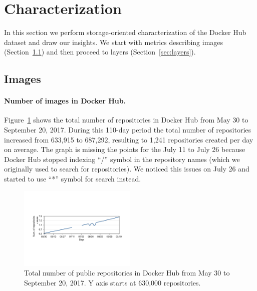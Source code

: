 \section{Characterization}
\label{sec:char}

In this section we perform storage-oriented characterization of the Docker Hub
dataset and draw our insights.
%
We start with metrics describing images (Section~\ref{sec:images}) and then
proceed to layers (Section~\ref{sec:layers}).

\subsection{Images}
\label{sec:images}

\paragraph{Number of images in Docker Hub.}

Figure~\ref{fig_image_growth} shows the total number of repositories in Docker
Hub from May 30 to September 20, 2017.
During this 110-day period the total number of repositories increased from
633,915 to 687,292, resulting to 1,241 repositories created per day on average.
%
The graph is missing the points for the July 11 to July 26 because Docker Hub
stopped indexing ``/'' symbol in the repository names (which we originally used to
search for repositories).
%
We noticed this issues on July 26 and started to use ``*'' symbol for search
instead.



\begin{figure}
  \centering
  \includegraphics[width=0.5\textwidth]{graphs/image_growth.pdf}
  \caption{Total number of public repositories in Docker Hub
	   from May 30 to September 20, 2017. Y axis starts
	   at 630,000 repositories.
	  }
  \label{fig_image_growth}
\end{figure}


